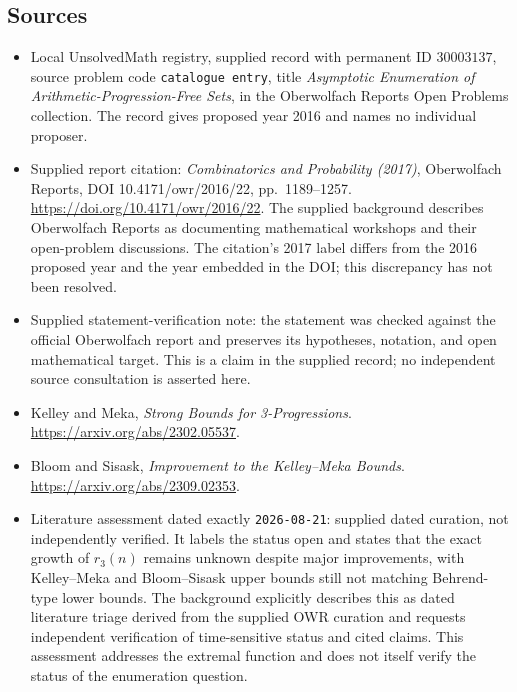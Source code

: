\documentclass[11pt]{article}
\begin{document}
\subsection{Sources}
\begin{itemize}
\item Local UnsolvedMath registry, supplied record with permanent ID \(30003137\), source problem code \texttt{catalogue entry}, title \emph{Asymptotic Enumeration of Arithmetic-Progression-Free Sets}, in the Oberwolfach Reports Open Problems collection. The record gives proposed year 2016 and names no individual proposer.
\item Supplied report citation: \emph{Combinatorics and Probability (2017)}, Oberwolfach Reports, DOI 10.4171/owr/2016/22, pp.\ 1189--1257. \url{https://doi.org/10.4171/owr/2016/22}. The supplied background describes Oberwolfach Reports as documenting mathematical workshops and their open-problem discussions. The citation's 2017 label differs from the 2016 proposed year and the year embedded in the DOI; this discrepancy has not been resolved.
\item Supplied statement-verification note: the statement was checked against the official Oberwolfach report and preserves its hypotheses, notation, and open mathematical target. This is a claim in the supplied record; no independent source consultation is asserted here.
\item Kelley and Meka, \emph{Strong Bounds for 3-Progressions}. \url{https://arxiv.org/abs/2302.05537}.
\item Bloom and Sisask, \emph{Improvement to the Kelley--Meka Bounds}. \url{https://arxiv.org/abs/2309.02353}.
\item Literature assessment dated exactly \texttt{2026-08-21}: supplied dated curation, not independently verified. It labels the status open and states that the exact growth of \(r_3(n)\) remains unknown despite major improvements, with Kelley--Meka and Bloom--Sisask upper bounds still not matching Behrend-type lower bounds. The background explicitly describes this as dated literature triage derived from the supplied OWR curation and requests independent verification of time-sensitive status and cited claims. This assessment addresses the extremal function and does not itself verify the status of the enumeration question.
\end{itemize}
\end{document}
